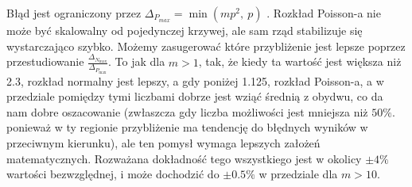 \documentclass{article}
\begin{document}
Błąd jest ograniczony przez $\Delta_{P_{max}} = \min (mp^{2}, \:p)$ . Rozkład Poisson-a nie może być skalowalny od pojedynczej krzywej, ale sam rząd stabilizuje się wystarczająco szybko. Możemy zasugerować które przybliżenie jest lepsze poprzez przestudiowanie $\frac{\Delta_{N_{\max}}}{\Delta_{P_{\max}}}$. To jak dla $m > 1$, tak, że kiedy ta wartość jest większa niż 2.3, rozkład normalny jest lepszy, a gdy poniżej 1.125, rozkład Poisson-a, a w przedziale pomiędzy tymi liczbami dobrze jest wziąć średnią z obydwu, co da nam dobre oszacowanie (zwłaszcza gdy liczba możliwości jest mniejsza niż $50\%$. ponieważ w ty regionie przybliżenie ma tendencję do błędnych wyników w przeciwnym kierunku), ale ten pomysł wymaga lepszych założeń matematycznych. Rozważana dokładność tego wszystkiego jest w okolicy $\pm 4 \%$  wartości bezwzględnej, i może dochodzić do $\pm 0.5\%$ w przedziale dla $m > 10$.
\end{document}
